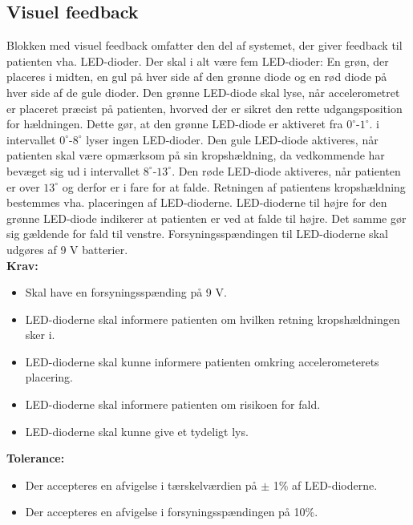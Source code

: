 \subsection{Visuel feedback}
Blokken med visuel feedback omfatter den del af systemet, der giver feedback til patienten vha. LED-dioder. Der skal i alt være fem LED-dioder: En grøn, der placeres i midten, en gul på hver side af den grønne diode og en rød diode på hver side af de gule dioder. Den grønne LED-diode skal lyse, når accelerometret er placeret præcist på patienten, hvorved der er sikret den rette udgangsposition for hældningen. Dette gør, at den grønne LED-diode er aktiveret fra $0^{\circ}$-$1^{\circ}$. i intervallet $0^{\circ}$-$8^{\circ}$ lyser ingen LED-dioder. Den gule LED-diode aktiveres, når patienten skal være opmærksom på sin kropshældning, da vedkommende har bevæget sig ud i intervallet $8^{\circ}$-$13^{\circ}$. Den røde LED-diode aktiveres, når patienten er over $13^{\circ}$ og derfor er i fare for at falde. Retningen af patientens kropshældning bestemmes vha. placeringen af LED-dioderne. LED-dioderne til højre for den grønne LED-diode indikerer at patienten er ved at falde til højre. Det samme gør sig gældende for fald til venstre. Forsyningsspændingen til LED-dioderne skal udgøres af 9 V batterier.   
\\
\textbf{Krav:}
\begin{itemize}
	\item Skal have en forsyningsspænding på 9 V.
	\item LED-dioderne skal informere patienten om hvilken retning kropshældningen sker i.
	\item LED-dioderne skal kunne informere patienten omkring accelerometerets placering.
	\item LED-dioderne skal informere patienten om risikoen for fald.
	\item LED-dioderne skal kunne give et tydeligt lys.
\end{itemize}
\textbf{Tolerance:}
\begin{itemize}
	\item Der accepteres en afvigelse i tærskelværdien på $\pm$ 1\% af LED-dioderne.
	\item Der accepteres en afvigelse i forsyningsspændingen på 10\%.
\end{itemize}
